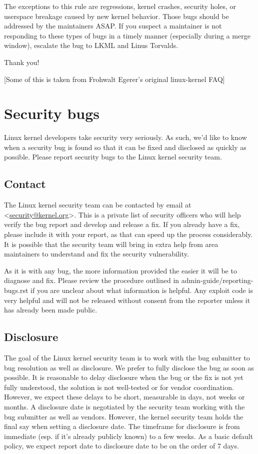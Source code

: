 \documentclass[a4paper,8pt,english]{sphinxmanual}
\begin{document}
The exceptions to this rule are regressions, kernel crashes, security holes,
or userspace breakage caused by new kernel behavior.  Those bugs should be
addressed by the maintainers ASAP.  If you suspect a maintainer is not
responding to these types of bugs in a timely manner (especially during a
merge window), escalate the bug to LKML and Linus Torvalds.

Thank you!

{[}Some of this is taken from Frohwalt Egerer's original linux-kernel FAQ{]}


\chapter{Security bugs}
\label{admin-guide/security-bugs:securitybugs}\label{admin-guide/security-bugs::doc}\label{admin-guide/security-bugs:security-bugs}
Linux kernel developers take security very seriously.  As such, we'd
like to know when a security bug is found so that it can be fixed and
disclosed as quickly as possible.  Please report security bugs to the
Linux kernel security team.


\section{Contact}
\label{admin-guide/security-bugs:contact}
The Linux kernel security team can be contacted by email at
\textless{}\href{mailto:security@kernel.org}{security@kernel.org}\textgreater{}.  This is a private list of security officers
who will help verify the bug report and develop and release a fix.
If you already have a fix, please include it with your report, as
that can speed up the process considerably.  It is possible that the
security team will bring in extra help from area maintainers to
understand and fix the security vulnerability.

As it is with any bug, the more information provided the easier it
will be to diagnose and fix.  Please review the procedure outlined in
admin-guide/reporting-bugs.rst if you are unclear about what
information is helpful.  Any exploit code is very helpful and will not
be released without consent from the reporter unless it has already been
made public.


\section{Disclosure}
\label{admin-guide/security-bugs:disclosure}
The goal of the Linux kernel security team is to work with the
bug submitter to bug resolution as well as disclosure.  We prefer
to fully disclose the bug as soon as possible.  It is reasonable to
delay disclosure when the bug or the fix is not yet fully understood,
the solution is not well-tested or for vendor coordination.  However, we
expect these delays to be short, measurable in days, not weeks or months.
A disclosure date is negotiated by the security team working with the
bug submitter as well as vendors.  However, the kernel security team
holds the final say when setting a disclosure date.  The timeframe for
disclosure is from immediate (esp. if it's already publicly known)
to a few weeks.  As a basic default policy, we expect report date to
disclosure date to be on the order of 7 days.
\end{document}
